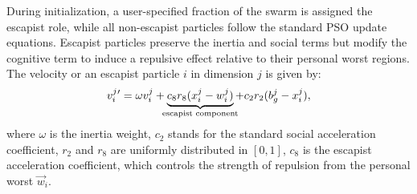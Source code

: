 {During initialization, a user-specified fraction of the swarm is assigned the escapist role, while all non-escapist particles follow the standard PSO update equations. Escapist particles preserve the inertia and social terms but modify the cognitive term to induce a repulsive effect relative to their personal worst regions.
The velocity or an escapist particle $i$ in dimension $j$ is given by:
\begin{equation}\label{eq:velocity_update_escapist}
    v_{i}^{j}{}' = \omega v_{i}^{j} +
\underbrace{c_8 r_8 (x_{i}^{j} - w_{i}^{j})}_{\mathclap{\text{escapist component}}} +
c_2 r_2 (b_{g}^{j} - x_{i}^{j}),
\end{equation}
where
$\omega$ is the inertia weight,
$c_2$ stands for the standard social acceleration coefficient,
$r_2$ and $r_8$ are uniformly distributed in $[0, 1]$,
$c_8$ is the escapist acceleration coefficient, which controls the strength of repulsion from the personal worst $\vec{w}_i$.

\begin{figure}[H]
    \centering
\end{figure}}
